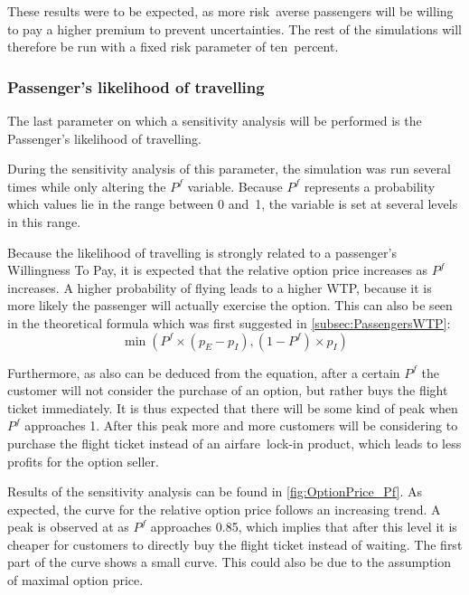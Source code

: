 These results were to be expected, as more risk~averse passengers will be willing to pay a higher premium to prevent uncertainties. The rest of the simulations will therefore be run with a fixed risk parameter of ten~percent.


\subsubsection{Passenger's likelihood of travelling}
The last parameter on which a sensitivity analysis will be performed is the Passenger's likelihood of travelling.

During the sensitivity analysis of this parameter, the simulation was run several times while only altering the $P^f$ variable. Because $P^f$ represents a probability which values lie in the range between 0 and~1, the variable is set at several levels in this range.

Because the likelihood of travelling is strongly related to a passenger's Willingness To Pay, it is expected that the relative option price increases as $P^f$ increases. A higher probability of flying leads to a higher WTP, because it is more likely the passenger will actually exercise the option.  This can also be seen in the theoretical formula which was first suggested in \autoref{subsec:PassengersWTP}:
\begin{equation}
\min(P^f \times (p_E - p_I), (1 - P^f) \times p_I)
\end{equation}

Furthermore, as also can be deduced from the equation, after a certain $P^f$ the customer will not consider the purchase of an option, but rather buys the flight ticket immediately. It is thus expected that there will be some kind of peak when $P^f$ approaches 1. After this peak more and more customers will be considering to purchase the flight ticket instead of an airfare~lock-in product, which leads to less profits for the option seller.

Results of the sensitivity analysis can be found in  \autoref{fig:OptionPrice_Pf}. As expected, the curve for the relative option price follows an increasing trend. A peak is observed at as $P^f$ approaches 0.85, which implies that after this level it is cheaper for customers to directly buy the flight ticket instead of waiting. The first part of the curve shows a small curve. This could also be due to the assumption of maximal option price.

